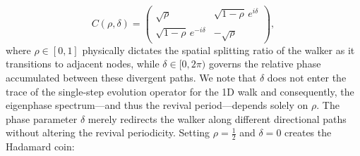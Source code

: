 \begin{equation}
C(\rho, \delta) =
\begin{pmatrix}
\sqrt{\rho} & \sqrt{1-\rho}\, e^{i\delta} \\[4pt]
\sqrt{1-\rho}\, e^{-i\delta} & -\sqrt{\rho}
\end{pmatrix},
\label{eq:1d_coin}
\end{equation}
where \(\rho \in [0, 1]\) physically dictates the spatial splitting
ratio of the walker as it transitions to adjacent nodes, while
\(\delta \in [0, 2\pi)\) governs the relative phase accumulated between
these divergent paths. We note that 
\(\delta\) does not enter the trace of the single-step evolution
operator for the 1D walk and consequently, the eigenphase
spectrum---and thus the revival period---depends solely on \(\rho\).
The phase parameter \(\delta\) merely redirects the walker along
different directional paths without altering the revival periodicity.
Setting \(\rho = \frac{1}{2}\) and \(\delta = 0\)
creates the Hadamard coin:
